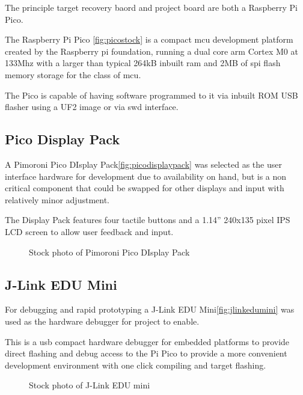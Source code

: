The principle target recovery baord and project board are both a Raspberry Pi Pico.

The Raspberry Pi Pico \autoref{fig:picostock} is a compact \gls{mcu} development platform created by the Raspberry pi foundation, running a dual core \gls{arm} Cortex M0 at 133Mhz with a larger than typical 264kB inbuilt \gls{ram} and 2MB of \gls{spi} flash memory storage for the class of \gls{mcu}\cite{ltdBuyRaspberryPi}.

The Pico is capable of having software programmed to it via inbuilt ROM USB flasher using a UF2 image or via \gls{swd} interface.

\subsection{Pico Display Pack}
A Pimoroni Pico DIsplay Pack\autoref{fig:picodisplaypack} was selected as the user interface hardware for development due to availability on hand, but is a non critical component that could be swapped for other displays and input with relatively minor adjustment.

The Display Pack features four tactile buttons and a 1.14” 240x135 pixel IPS LCD screen to allow user feedback and input.

\begin{figure}[ht]
	\centering
	\caption{Stock photo of Pimoroni Pico DIsplay Pack\cite{PicoDisplayPack}}
	\label{fig:picodisplaypack}
\end{figure}
	
\clearpage
\subsection{J-Link EDU Mini}
For debugging and rapid prototyping a J-Link EDU Mini\cite{JLinkEDUMini}\autoref{fig:jlinkedumini} was used as the hardware debugger for project to enable.

This is a \gls{usb} compact hardware debugger for embedded platforms to provide direct flashing and debug access to the Pi Pico to provide a more convenient development environment with one click compiling and target flashing.

\begin{figure}[ht]
	\centering
	\caption{Stock photo of J-Link EDU mini\cite{JLinkEDUMini}}
	\label{fig:jlinkedumini}
\end{figure}

